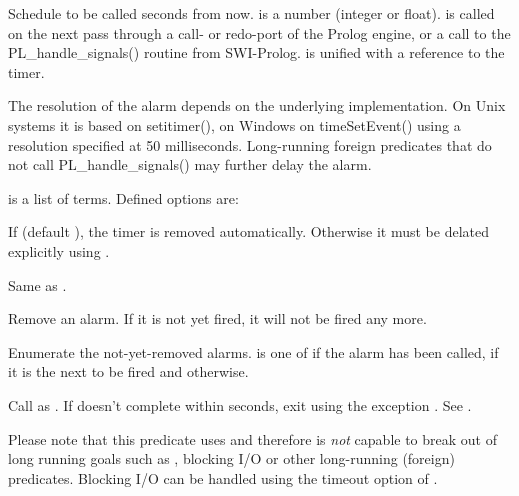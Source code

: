 \documentclass[11pt]{article}
\begin{document}
\begin{description}
Schedule  to be called  seconds from now.
 is a number (integer or float).   is called
on the next pass through a call- or redo-port of the Prolog engine,
or a call to the PL_handle_signals() routine from SWI-Prolog.  
is unified with a reference to the timer.

The resolution of the alarm depends on the underlying implementation.
On Unix systems it is based on setitimer(), on Windows on timeSetEvent()
using a resolution specified at 50 milliseconds.  Long-running foreign
predicates that do not call PL_handle_signals() may further delay the
alarm.

 is a list of  terms.  Defined 
options are:

\begin{description}
If  (default ), the timer is removed
automatically.  Otherwise it must be delated explicitly using
.
\end{description}

Same as .

Remove an alarm.  If it is not yet fired, it will not be fired
any more.

Enumerate the not-yet-removed alarms.   is one of
 if the alarm has been called,  if it
is the next to be fired and  otherwise.

Call  as .  If  doesn't complete within
 seconds, exit using the exception
.  See .

Please note that this predicate uses  and therefore is \emph{not}
capable to break out of long running goals such as , blocking I/O
or other long-running (foreign) predicates.  Blocking I/O can be handled
using the timeout option of .
\end{description}
\end{document}
